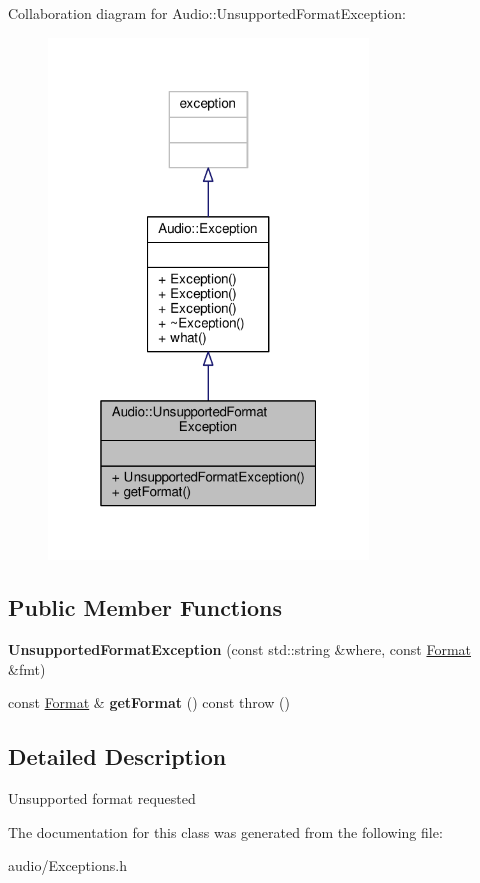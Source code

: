 Collaboration diagram for Audio\+:\+:Unsupported\+Format\+Exception\+:
\nopagebreak
\begin{figure}[H]
\begin{center}
\leavevmode
\includegraphics[width=241pt]{d5/d6e/classAudio_1_1UnsupportedFormatException__coll__graph}
\end{center}
\end{figure}
\subsection*{Public Member Functions}
\begin{DoxyCompactItemize}
\item 
{\bfseries Unsupported\+Format\+Exception} (const std\+::string \&where, const \hyperlink{structAudio_1_1Format}{Format} \&fmt)\hypertarget{classAudio_1_1UnsupportedFormatException_a5841ca08594e74dd5cc712e93e0ee997}{}\label{classAudio_1_1UnsupportedFormatException_a5841ca08594e74dd5cc712e93e0ee997}

\item 
const \hyperlink{structAudio_1_1Format}{Format} \& {\bfseries get\+Format} () const   throw ()\hypertarget{classAudio_1_1UnsupportedFormatException_a11de571afc1479c3c32a5825d74d7eaf}{}\label{classAudio_1_1UnsupportedFormatException_a11de571afc1479c3c32a5825d74d7eaf}

\end{DoxyCompactItemize}


\subsection{Detailed Description}
Unsupported format requested 

The documentation for this class was generated from the following file\+:\begin{DoxyCompactItemize}
\item 
audio/Exceptions.\+h\end{DoxyCompactItemize}
